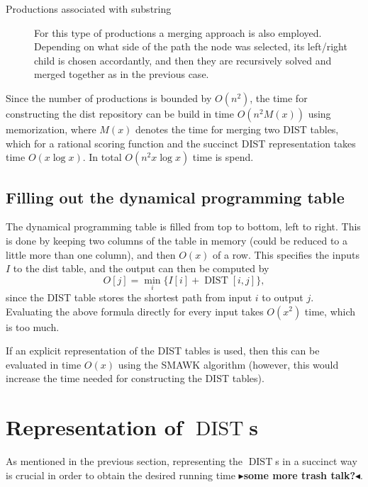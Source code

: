 \documentclass[twoside,11pt,openright]{report}
\newcommand{\todo}[1]{{\color[rgb]{.5,0,0}\textbf{$\blacktriangleright$#1$\blacktriangleleft$}}}
\newcommand{\DIST}{\operatorname{DIST}}
\begin{document}
\begin{description}
  \item[Productions associated with substring] For this type of productions a merging approach is also employed. Depending on what side of the path the node was selected, its left/right child is chosen accordantly, and then they are recursively solved and merged together as in the previous case.
\end{description}
Since the number of productions is bounded by $O(n^2)$, the time for constructing the dist repository can be build in time $O(n^2 M(x))$ using memorization, where $M(x)$ denotes the time for merging two DIST tables, which for a rational scoring function and the succinct DIST representation takes time $O(x \log{x})$. In total $O(n^2x\log{x})$ time is spend.

\subsection{Filling out the dynamical programming table}
\label{sec:algorithm:filling-grid-overview}
The dynamical programming table is filled from top to bottom, left to right. This is done by keeping two columns of the table in memory (could be reduced to a little more than one column), and then $O(x)$ of a row. This specifies the inputs $I$ to the dist table, and the output can then be computed by
\begin{equation}
  \label{eqn:dist-application}
  O[j] = \min_i \{ I[i] + \DIST[i, j] \},
\end{equation}
since the DIST table stores the shortest path from input $i$ to output $j$. Evaluating the above formula directly for every input takes $O(x^2)$ time, which is too much.

If an explicit representation of the DIST tables is used, then this can be evaluated in time $O(x)$ using the SMAWK algorithm (however, this would increase the time needed for constructing the DIST tables).

\section{Representation of $\DIST$s}
As mentioned in the previous section, representing the $\DIST$s in a succinct way is crucial in order to obtain the desired running time \todo{some more trash talk?}.
\end{document}
